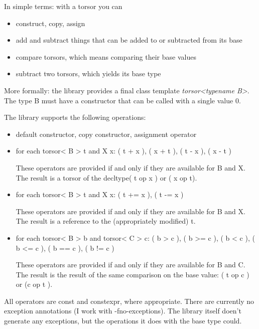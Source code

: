 \documentclass[]{article}
\providecommand{\tightlist}{%
  \setlength{\itemsep}{0pt}\setlength{\parskip}{0pt}}
\begin{document}
In simple terms: with a torsor you can

\begin{itemize}
\tightlist
\item
  construct, copy, assign
\item
  add and subtract things that can be added to or subtracted from its
  base
\item
  compare torsors, which means comparing their base values
\item
  subtract two torsors, which yields its base type
\end{itemize}

More formally: the library provides a final class template
\emph{torsor\textless{}typename B\textgreater{}}. The type B must have a
constructor that can be called with a single value 0.

The library supports the following operations:

\begin{itemize}
\item
  default constructor, copy constructor, assignment operator
\item
  for each torsor\textless{} B \textgreater{} t and X x: ( t + x ), ( x
  + t ), ( t - x ), ( x - t )

  These operators are provided if and only if they are available for B
  and X. The result is a torsor of the decltype( t op x ) or ( x op t).
\item
  for each torsor\textless{} B \textgreater{} t and X x: ( t += x ), ( t
  -= x )

  These operators are provided if and only if they are available for B
  and X. The result is a reference to the (appropriately modified) t.
\item
  for each torsor\textless{} B \textgreater{} b and torsor\textless{} C
  \textgreater{} c: ( b \textgreater{} c ), ( b \textgreater{}= c ), ( b
  \textless{} c ), ( b \textless{}= c ), ( b == c ), ( b != c )

  These operators are provided if and only if they are available for B
  and C. The result is the result of the same comparison on the base
  value: ( t op c ) or (c op t ).
\end{itemize}

All operators are const and constexpr, where appropriate. There are
currently no exception annotations (I work with -fno-exceptions). The
library itself doen't generate any exceptions, but the operations it
does with the base type could.
\end{document}
